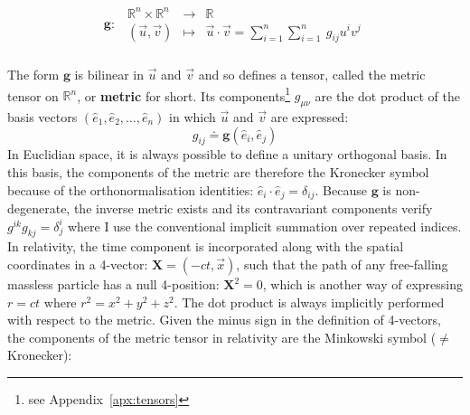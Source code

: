 \begin{eqnarray}
\pmb{g}: ~~ \begin{array}{ccc}
\mathbb{R}^n \times \mathbb{R}^n & \longrightarrow &\mathbb{R}\\
\left( \vec{u}, \vec{v} \right) & \longmapsto & \vec{u} \cdot \vec{v} = \displaystyle \sum_{i=1}^{n}\sum_{i=1}^{n}~g_{ij} u^i v^j
\end{array}
\end{eqnarray} \\

The form $\pmb{g}$ is bilinear in $\vec{u}$ and $\vec{v}$ and so defines a tensor, called the metric tensor on $\mathbb{R}^n$, or \textbf{metric} for short. Its components\footnote{see Appendix~\ref{apx:tensors}} $g_{\mu \nu}$ are the dot product of the basis vectors $\left( \hat{e}_1, \hat{e}_2, \hdots, \hat{e}_n \right)$ in which $\vec{u}$ and $\vec{v}$ are expressed:
\begin{equation}
g_{ij} \doteq \pmb{g} \left( \hat{e}_i, \hat{e}_j \right)
\end{equation} In Euclidian space, it is always possible to define a unitary orthogonal basis. In this basis, the components of the metric are therefore the Kronecker symbol because of the orthonormalisation identities: $\hat{e}_i \cdot \hat{e}_j = \delta_{ij}$. Because $\pmb{g}$ is non-degenerate, the inverse metric exists and its contravariant components verify $g^{i k} g_{k j} = \delta^i_j$ where I use the conventional implicit summation over repeated indices. In relativity, the time component is incorporated along with the spatial coordinates in a 4-vector: $\pmb{X} = (-ct, \vec{x})$, such that the path of any free-falling massless particle has a null 4-position: $\pmb{X}^2 = 0$, which is another way of expressing $r = ct$ where $r^2 = x^2 + y^2 + z^2$. The dot product is always implicitly performed with respect to the metric. Given the minus sign in the definition of 4-vectors, the components of the metric tensor in relativity are the Minkowski symbol ($\neq$ Kronecker): \\

